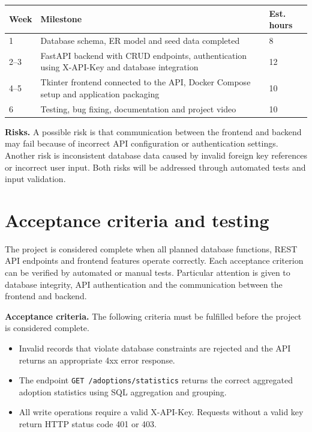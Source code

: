 \documentclass[11pt,a4paper]{article}
\begin{document}
\renewcommand{\arraystretch}{1.2}
\begin{tabularx}{\linewidth}{@{}p{1.4cm}Xp{1.8cm}@{}}
\toprule
\textbf{Week} & \textbf{Milestone} & \textbf{Est. hours} \\
\midrule
1 & Database schema, ER model and seed data completed & 8 \\

2--3 & FastAPI backend with CRUD endpoints, authentication using
X-API-Key and database integration & 12 \\

4--5 & Tkinter frontend connected to the API, Docker Compose setup and
application packaging & 10 \\

6 & Testing, bug fixing, documentation and project video & 10 \\
\bottomrule
\end{tabularx}

\textbf{Risks.} A possible risk is that communication between the frontend and backend may fail
because of incorrect API configuration or authentication settings. Another risk
is inconsistent database data caused by invalid foreign key references or
incorrect user input. Both risks will be addressed through automated tests and
input validation.
\section{Acceptance criteria and testing}

The project is considered complete when all planned database functions, REST API
endpoints and frontend features operate correctly. Each acceptance criterion can
be verified by automated or manual tests. Particular attention is given to
database integrity, API authentication and the communication between the
frontend and backend.

\textbf{Acceptance criteria.} The following criteria must be fulfilled before the project is considered
complete.
\begin{itemize}[topsep=2pt]
  \item Invalid records that violate database constraints are rejected and the API
returns an appropriate 4xx error response.

\item The endpoint \texttt{GET /adoptions/statistics} returns the correct
aggregated adoption statistics using SQL aggregation and grouping.

\item All write operations require a valid X-API-Key. Requests without a valid
key return HTTP status code 401 or 403.
\end{itemize}
\end{document}
